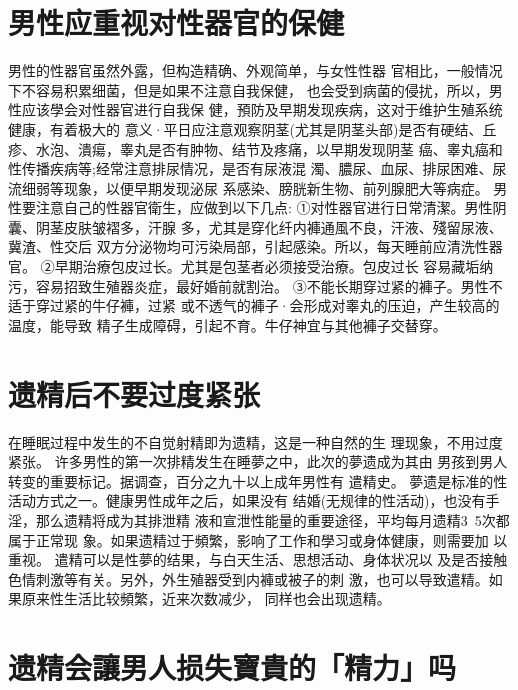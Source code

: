 \documentclass[12pt,UTF8]{ctexbook}
\begin{document}
\section{男性应重视对性器官的保健}

男性的性器官虽然外露，但构造精确、外观简单，与女性性器
官相比，一般情况下不容易积累细菌，但是如果不注意自我保健，
也会受到病菌的侵扰，所以，男性应该學会对性器官进行自我保
健，預防及早期发现疾病，这对于维护生殖系统健康，有着极大的
意义·平日应注意观察阴茎(尤其是阴茎头部)是否有硬结、丘
疹、水泡、潰瘍，睾丸是否有肿物、结节及疼痛，以早期发现阴茎
癌、睾丸癌和性传播疾病等;经常注意排尿情况，是否有尿液混
濁、膿尿、血尿、排尿困难、尿流细弱等现象，以便早期发现泌尿
系感染、膀胱新生物、前列腺肥大等病症。
男性要注意自己的性器官衛生，应做到以下几点:
①对性器官进行日常清潔。男性阴囊、阴茎皮肤皱褶多，汗腺
多，尤其是穿化纤内褲通風不良，汗液、殘留尿液、冀渣、性交后
双方分泌物均可污染局部，引起感染。所以，每天睡前应清洗性器
官。
②早期治療包皮过长。尤其是包茎者必须接受治療。包皮过长
容易藏垢纳污，容易招致生殖器炎症，最好婚前就割治。
③不能长期穿过紧的褲子。男性不适于穿过紧的牛仔褲，过紧
或不透气的褲子·会形成对睾丸的压迫，产生较高的温度，能导致
精子生成障碍，引起不育。牛仔神宜与其他褲子交替穿。

\section{遗精后不要过度紧张}

在睡眠过程中发生的不自觉射精即为遗精，这是一种自然的生
理现象，不用过度紧张。
许多男性的第一次排精发生在睡夢之中，此次的夢遗成为其由
男孩到男人转变的重要标记。据调查，百分之九十以上成年男性有
遣精史。
夢遗是标准的性活动方式之一。健康男性成年之后，如果没有
结婚(无规律的性活动)，也没有手淫，那么遗精将成为其排泄精
液和宣泄性能量的重要途径，平均每月遗精3~5次都属于正常现
象。如果遗精过于頻繁，影响了工作和學习或身体健康，则需要加
以重视。
遣精可以是性夢的结果，与白天生活、思想活动、身体状况以
及是否接触色情刺激等有关。另外，外生殖器受到内褲或被子的刺
激，也可以导致遣精。如果原来性生活比较頻繁，近来次数减少，
同样也会出现遗精。

\section{遗精会讓男人损失寶貴的「精力」吗}
\end{document}
